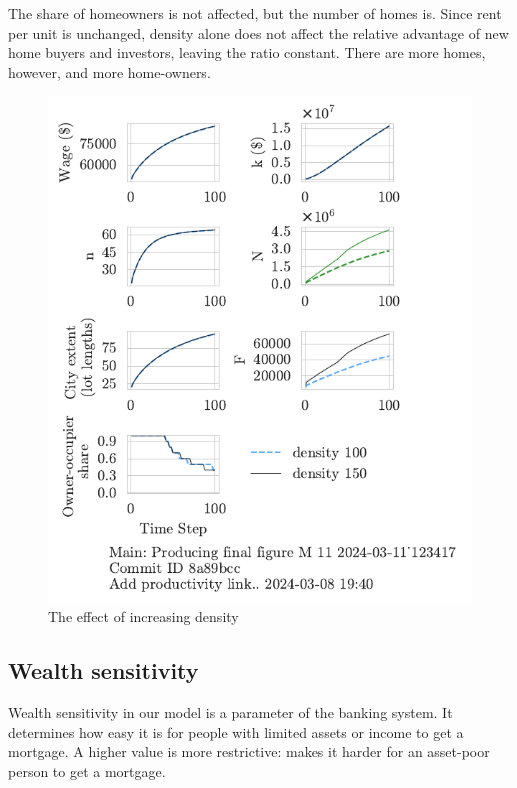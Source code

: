 The share of homeowners is not affected, but the number of homes is. Since rent per unit is unchanged, density alone does not affect the relative advantage of new home buyers and investors, leaving the ratio constant. There are more homes, however, and more home-owners. 

\begin{figure}[h!bt]
    \centering
    \includegraphics[scale=.8, trim={0 1.4cm 0 0},clip]{fig/density-Main-123417.pdf}
    \caption{The effect of increasing density}
    \label{fig:density_ownership_trajectory}
\end{figure}


\newpage

\subsection{Wealth sensitivity}
Wealth sensitivity in our model is a parameter of the banking system. It determines how easy it is for people with limited assets or income to get a mortgage. A higher value is more restrictive:  makes it harder for an asset-poor person to get a mortgage.

